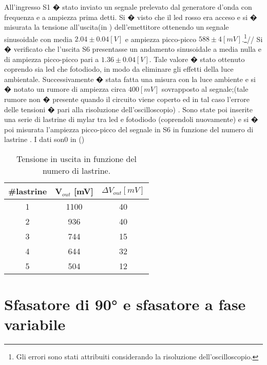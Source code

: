 All'ingresso S1 � stato inviato un segnale prelevato dal generatore d'onda con frequenza e a ampiezza prima detti. Si � visto che il led rosso era acceso e si � misurata la tensione all'uscita(in ) dell'emettitore ottenendo un segnale sinusoidale con media $2.04 \pm 0.04 [V]$ e ampiezza picco-picco $588 \pm 4 [mV]$.\footnote{Gli errori sono stati attribuiti considerando la risoluzione dell'oscilloscopio.}//
Si � verificato che l'uscita S6 presentasse un andamento sinusoidale a media nulla e di ampiezza picco-picco pari a $1.36 \pm 0.04 [V]$. Tale valore � stato ottenuto coprendo sia led che fotodiodo, in modo da eliminare gli effetti della luce ambientale. Successivamente � stata fatta una misura con la luce ambiente e si � notato un rumore di ampiezza circa $400 [mV]$ sovrapposto al segnale;(tale rumore non � presente quando il circuito viene coperto ed in tal caso l'errore delle tensioni � pari alla risoluzione dell'oscilloscopio) . Sono state poi inserite una serie di lastrine di mylar tra led e fotodiodo (coprendoli nuovamente) e si � poi misurata l'ampiezza picco-picco del segnale in S6 in funzione del numero di lastrine . I dati son0 in ()

\begin{table}[h]
	\centering
	\begin{tabular}{ccc}		
		 {\#lastrine }& {V$_{out}$ [mV]}& {$\Delta V_{out}[mV]$}\\
		 \midrule
                       1 & 1100 & 40\\
                       2 & 936 & 40\\
                       3 & 744 & 15\\
                       4 & 644 & 32\\
                       5 & 504 & 12\\
 	\end{tabular}
	\caption{Tensione in uscita in funzione del numero di lastrine.}
	\label{t:lastrine}
\end{table}

\section{Sfasatore di \ang{90} e sfasatore a fase variabile}

